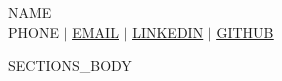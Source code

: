 \documentclass[letterpaper,11pt]{article}
\begin{document}
\begin{center}
    {\Huge \scshape {{NAME}}} \\ \vspace{1pt}
    \small {{PHONE}} $|$ \href{mailto:{{EMAIL}}}{\underline{{{EMAIL}}}} $|$
    \href{https://{{LINKEDIN}}}{\underline{{{LINKEDIN}}}} $|$
    \href{https://{{GITHUB}}}{\underline{{{GITHUB}}}}
\end{center}

{{SECTIONS_BODY}}

\end{document}
